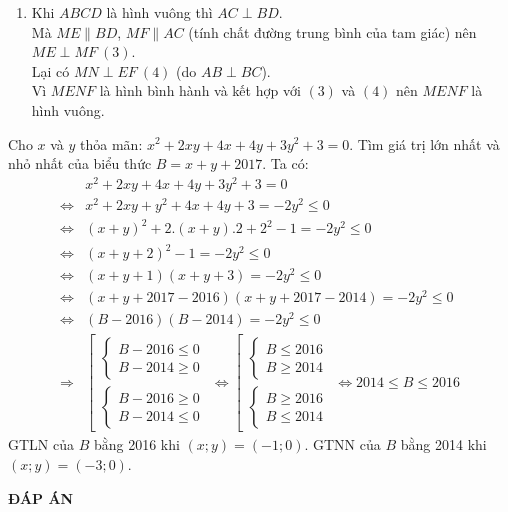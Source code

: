 \begin{ex}
{\begin{enumerate}
			Tương tự vì tứ giác $MENF$ là hình bình hành có $O$ là trung điểm của đường chéo $EF$ nên $O$ là trung điểm của đường chéo $MN$. \\
			Vậy $AC,BD,EF,MN$ đồng quy tại $O$.
			\item Khi $ABCD$ là hình vuông thì $AC \perp BD$. \\
			Mà $ME \parallel BD$, $MF \parallel AC$ (tính chất đường trung bình của tam giác) nên $ME \perp MF~(3)$. \\
			Lại có $MN \perp EF~(4)$ (do $AB \perp BC$). \\
			Vì $MENF$ là hình bình hành và kết hợp với $(3)$ và $(4)$ nên $MENF$ là hình vuông.
		\end{enumerate}
	}
\end{ex}

\begin{ex}%
	Cho $x$ và $y$ thỏa mãn: $x^2+2xy+4x+4y+3y^2+3=0$. Tìm giá trị lớn nhất và nhỏ nhất của biểu thức $B=x+y+2017$.
	\loigiai
	{
		Ta có:
		\begin{align*}
			& x^2+2xy+4x+4y+3y^2+3=0 \\
			\Leftrightarrow & x^2+2xy+y^2+4x+4y+3=-2y^2 \le 0 \\
			\Leftrightarrow & (x+y)^2+2.(x+y).2 +2^2-1=-2y^2 \le 0 \\
			\Leftrightarrow & (x+y+2)^2-1=-2y^2 \le 0 \\
			\Leftrightarrow & (x+y+1)(x+y+3)=-2y^2 \le 0 \\
			\Leftrightarrow & (x+y+2017-2016)(x+y+2017-2014) = -2y^2 \le 0 \\
			\Leftrightarrow & (B-2016)(B-2014)=-2y^2 \le 0 \\
			\Rightarrow & \left[\begin{aligned}
				\begin{cases}
					B-2016 \le 0 \\
					B-2014 \ge 0
				\end{cases} \\
				\begin{cases}
					B-2016 \ge 0 \\
					B-2014 \le 0
				\end{cases}
			\end{aligned}\right.
			\Leftrightarrow \left[\begin{aligned}
			\begin{cases}
				B \le 2016 \\
				B \ge 2014
			\end{cases} \\
			\begin{cases}
				B \ge 2016 \\
				B \le 2014
			\end{cases}
			\end{aligned}\right.
			\Leftrightarrow 2014 \le B \le 2016
		\end{align*}
		GTLN của $B$ bằng 2016 khi $(x;y)=(-1;0)$. GTNN của $B$ bằng 2014 khi $(x;y)=(-3;0)$.
	}
\end{ex}
\newpage
\begin{center}
	\textbf{ĐÁP ÁN}
\end{center}
\begin{multicols}{10}
	 
\end{multicols}